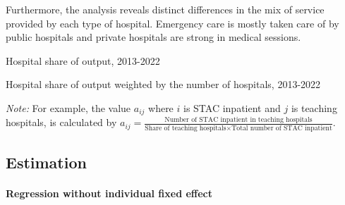\documentclass[12pt]{article}
\begin{document}
Furthermore, the analysis reveals distinct differences in the mix of service
provided by each type of hospital. Emergency care is mostly taken care of by
public hospitals and private hospitals are strong in medical sessions.

\begin{table}\fontsize{10pt}{12pt}\selectfont
    \begin{adjustbox}{width=\textwidth,center}
        \centering
        \begin{threeparttable}[b]

            
            \caption{Hospital share of output, 2013-2022}
            \label{tab:nonadjusted}
        \end{threeparttable}
    \end{adjustbox}
\end{table}

\begin{table}\fontsize{10pt}{12pt}\selectfont
    \centering
    \begin{adjustbox}{width=\textwidth,center}
        \begin{threeparttable}[b]
            
            \caption{Hospital share of output weighted by the number of hospitals, 2013-2022}
            \label{tab:output}
            \begin{tablenotes}
                \footnotesize
                \textit{Note:} For example, the value $a_{ij}$ where $i$ is STAC inpatient and $j$ is teaching hospitals, is calculated by $a_{ij}= \frac{\text{Number of STAC inpatient  in teaching hospitals}}{\text{Share of teaching hospitals}\times \text{Total number of STAC inpatient}}$.
            \end{tablenotes}

        \end{threeparttable}
    \end{adjustbox}

\end{table}

\subsection{Estimation}

\paragraph{Regression without individual fixed effect}
\end{document}
